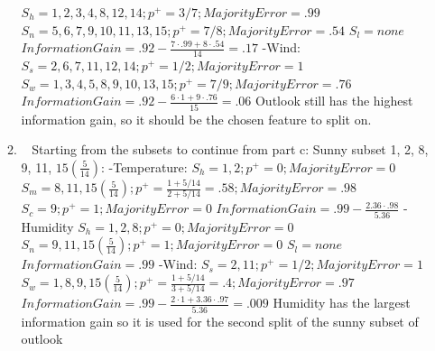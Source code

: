 \documentclass[12pt, fullpage,letterpaper]{article}
\begin{document}
\begin{enumerate}
\begin{enumerate}
	\newline $S_h = 1, 2, 3, 4, 8, 12, 14; p^+=3/7; Majority Error=.99$
	\newline $S_n=5, 6, 7, 9, 10, 11, 13, 15; p^+=7/8; Majority Error=.54$
	\newline $S_l=none$
	\newline $Information Gain=.92-\frac{7\cdot.99+8\cdot.54}{14}=.17$
	\newline -Wind:
	\newline $S_s = 2, 6, 7, 11, 12, 14; p^+=1/2; Majority Error=1$
	\newline $S_w=1, 3, 4, 5, 8, 9, 10, 13, 15; p^+=7/9; Majority Error=.76$
	\newline $Information Gain=.92-\frac{6\cdot1+9\cdot.76}{15}=.06$
	\newline
	\newline Outlook still has the highest information gain, so it should be the chosen feature to split on.
\item~
\newline Starting from the subsets to continue from part c:
\newline Sunny subset 1, 2, 8, 9, 11, $15(\frac{5}{14})$:
\newline -Temperature:
	\newline $S_h = 1, 2; p^+=0; Majority Error=0$
	\newline $S_m=8, 11, 15(\frac{5}{14}); p^+=\frac{1+5/14}{2+5/14}=.58; Majority Error=.98$
	\newline $S_c=9; p^+=1; Majority Error=0$
	\newline $Information Gain=.99-\frac{2.36\cdot.98}{5.36}$
	\newline -Humidity
	\newline $S_h = 1, 2, 8; p^+=0; Majority Error=0$
	\newline $S_n=9, 11, 15(\frac{5}{14}); p^+=1; Majority Error=0$
	\newline $S_l=none$
	\newline $Information Gain=.99$
	\newline -Wind:
	\newline $S_s = 2,11; p^+=1/2; Majority Error=1$
	\newline $S_w=1, 8, 9, 15(\frac{5}{14}); p^+=\frac{1+5/14}{3+5/14}=.4; Majority Error=.97$
	\newline $Information Gain=.99-\frac{2\cdot1+3.36\cdot.97}{5.36}=.009$
	\newline Humidity has the largest information gain so it is used for the second split of the sunny subset of outlook

\end{enumerate}
\end{enumerate}
\end{document}
